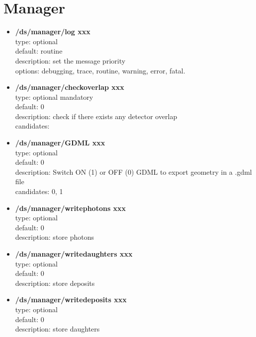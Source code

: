 \documentclass[twocolumn, 10pt]{article}
\begin{document}
\section{Manager}

\begin{itemize}

\item \textbf{/ds/manager/log xxx} \\ 
type: optional \\
default: routine\\
description: set the message priority\\
options: debugging,  trace,  routine,  warning,  error,  fatal.\\


\item \textbf{/ds/manager/checkoverlap xxx}\\
type: optional mandatory\\
default: 0\\
description: check if there exists any detector overlap \\
candidates: \\

\item \textbf{/ds/manager/GDML xxx}\\
type: optional\\
default: 0 \\
description: Switch ON (1) or OFF (0) GDML to export geometry in a .gdml file \\
candidates: 0, 1\\

\item \textbf{/ds/manager/writephotons xxx}\\
type: optional \\
default: 0 \\
description: store photons\\

\item \textbf{/ds/manager/writedaughters xxx}\\
type: optional \\
default: 0 \\
description: store deposits\\

\item \textbf{/ds/manager/writedeposits xxx}\\
type: optional \\
default: 0\\
description: store daughters\\


\end{itemize}
\end{document}
